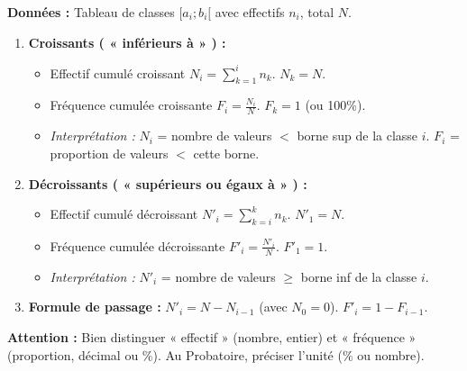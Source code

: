 \documentclass[11pt]{article}
\begin{document}
\begin{methode}
    \textbf{Données :} Tableau de classes $[a_i; b_i[$ avec effectifs $n_i$, total $N$.
    \begin{enumerate}
        \item \textbf{Croissants ( « inférieurs à » ) :}
        \begin{itemize}
            \item Effectif cumulé croissant $N_i = \sum_{k=1}^{i} n_k$. $N_k = N$.
            \item Fréquence cumulée croissante $F_i = \frac{N_i}{N}$. $F_k = 1$ (ou 100\%).
            \item \emph{Interprétation :} $N_i$ = nombre de valeurs $<$ borne sup de la classe $i$. $F_i$ = proportion de valeurs $<$ cette borne.
        \end{itemize}
        \item \textbf{Décroissants ( « supérieurs ou égaux à » ) :}
        \begin{itemize}
            \item Effectif cumulé décroissant $N'_i = \sum_{k=i}^{k} n_k$. $N'_1 = N$.
            \item Fréquence cumulée décroissante $F'_i = \frac{N'_i}{N}$. $F'_1 = 1$.
            \item \emph{Interprétation :} $N'_i$ = nombre de valeurs $\ge$ borne inf de la classe $i$.
        \end{itemize}
        \item \textbf{Formule de passage :} $N'_i = N - N_{i-1}$ (avec $N_0=0$). $F'_i = 1 - F_{i-1}$.
    \end{enumerate}
    \textbf{Attention :} Bien distinguer « effectif » (nombre, entier) et « fréquence » (proportion, décimal ou \%). Au Probatoire, préciser l'unité (\% ou nombre).
\end{methode}
\end{document}
